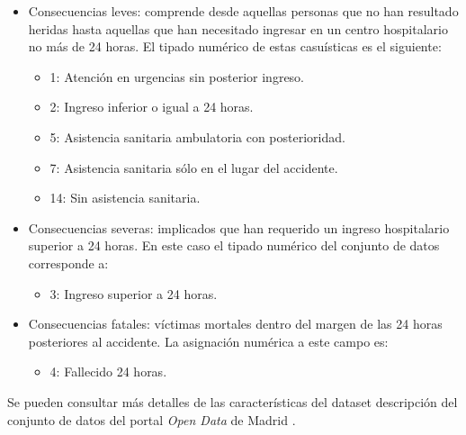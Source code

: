               \begin{itemize}
                    \item Consecuencias leves: comprende desde aquellas personas que no han resultado heridas hasta aquellas que han necesitado ingresar en un centro hospitalario no más de 24 horas. El tipado numérico de estas casuísticas es el siguiente:

                        \begin{itemize}
                            \item 1: Atención en urgencias sin posterior ingreso.
                            \item 2: Ingreso inferior o igual a 24 horas.
                            \item 5: Asistencia sanitaria ambulatoria con posterioridad.
                            \item 7: Asistencia sanitaria sólo en el lugar del accidente.
                            \item 14: Sin asistencia sanitaria.
                        \end{itemize}

                    \item Consecuencias severas: implicados que han requerido un ingreso hospitalario superior a 24 horas. En este caso el tipado numérico del conjunto de datos corresponde a:

                        \begin{itemize}
                            \item 3: Ingreso superior a 24 horas.
                        \end{itemize}

                    \item Consecuencias fatales: víctimas mortales dentro del margen de las 24 horas posteriores al accidente. La asignación numérica a este campo es:

                        \begin{itemize}
                            \item 4: Fallecido 24 horas.
                        \end{itemize}

                \end{itemize}


            Se pueden consultar más detalles de las características del dataset descripción del conjunto de datos del portal \textit{Open Data} de Madrid \cite{InfoDatasetMadrid}.


